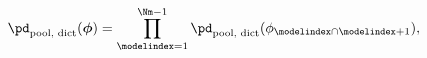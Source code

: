 \begin{equation}
  \pd_{\text{pool, dict}}(\boldsymbol{\phi}) =
    \prod_{\modelindex = 1}^{\Nm - 1} \pd_{\text{pool, dict}}(\phi_{\modelindex \cap \modelindex + 1}),
  \label{eqn:complete-dict-joint-def}
\end{equation}